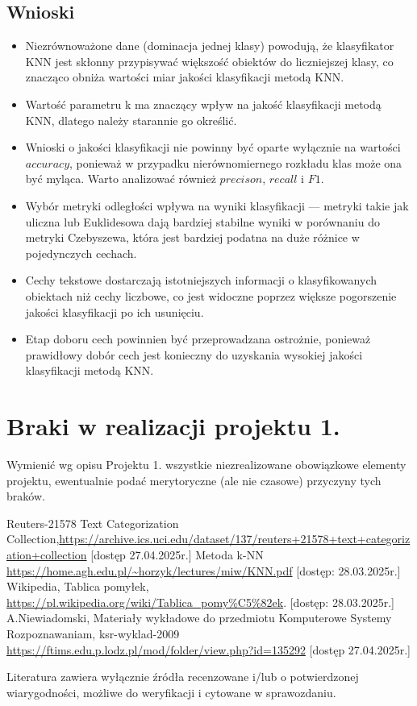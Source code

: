 \documentclass{article}
\begin{document}
\subsection{Wnioski}
\begin{itemize}
    \item Niezrównoważone dane (dominacja jednej klasy) powodują, że klasyfikator KNN jest skłonny przypisywać większość obiektów do liczniejszej klasy, co znacząco obniża wartości miar jakości klasyfikacji metodą KNN.
    \item Wartość parametru k ma znaczący wpływ na jakość klasyfikacji metodą KNN, dlatego należy starannie go określić.
    \item Wnioski o jakości klasyfikacji nie powinny być oparte wyłącznie na wartości \(accuracy\), ponieważ w przypadku nierównomiernego rozkładu klas może ona być myląca. Warto analizować również \(precison\), \(recall\) i \(F1\).
    \item Wybór metryki odległości wpływa na wyniki klasyfikacji — metryki takie jak uliczna lub Euklidesowa dają bardziej stabilne wyniki w porównaniu do metryki Czebyszewa, która jest bardziej podatna na duże różnice w pojedynczych cechach.
    \item Cechy tekstowe dostarczają istotniejszych informacji o klasyfikowanych obiektach niż cechy liczbowe, co jest widoczne poprzez większe pogorszenie jakości klasyfikacji po ich usunięciu.
    \item Etap doboru cech powinnien być przeprowadzana ostrożnie, ponieważ prawidłowy dobór cech jest konieczny do uzyskania wysokiej jakości klasyfikacji metodą KNN.
\end{itemize}


\section{Braki w realizacji projektu 1.}
Wymienić wg opisu Projektu 1. wszystkie niezrealizowane obowiązkowe elementy projektu, ewentualnie
podać merytoryczne (ale nie czasowe) przyczyny tych braków. 


\begin{thebibliography}{0}
 Reuters-21578 Text Categorization Collection,\url{https://archive.ics.uci.edu/dataset/137/reuters+21578+text+categorization+collection} [dostęp 27.04.2025r.]
 Metoda k-NN \url{https://home.agh.edu.pl/~horzyk/lectures/miw/KNN.pdf} [dostęp: 28.03.2025r.]
 Wikipedia, Tablica pomyłek, \url{https://pl.wikipedia.org/wiki/Tablica_pomy%C5%82ek}. [dostęp: 28.03.2025r.]
 A.Niewiadomski, Materiały wykładowe do przedmiotu Komputerowe Systemy Rozpoznawaniam, ksr-wyklad-2009 \url{https://ftims.edu.p.lodz.pl/mod/folder/view.php?id=135292} [dostęp 27.04.2025r.]
\end{thebibliography}

Literatura zawiera wyłącznie źródła recenzowane i/lub o potwierdzonej wiarygodności,
możliwe do weryfikacji i cytowane w sprawozdaniu. 
\end{document}
